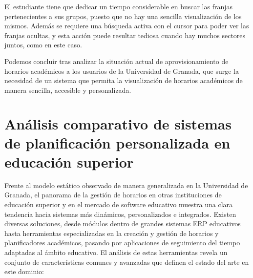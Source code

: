El estudiante tiene que dedicar un tiempo considerable en buscar las franjas pertenecientes a sus grupos, puesto que no hay una sencilla visualización de los mismos. Además se requiere una búsqueda activa con el cursor
para poder ver las franjas ocultas, y esta acción puede resultar tediosa cuando hay muchos sectores juntos, como en este caso.

Podemos concluir tras analizar la situación actual de aprovisionamiento de horarios académicos a los usuarios de la Universidad de Granada, que surge la necesidad de un sistema que permita la visualización de horarios académicos de manera sencilla, accesible y personalizada.

\section{Análisis comparativo de sistemas de planificación personalizada en educación superior}

Frente al modelo estático observado de manera generalizada en la Universidad de Granada, el panorama de la gestión de horarios en otras instituciones de educación superior y en el mercado de software educativo muestra una clara tendencia hacia sistemas más dinámicos, personalizados e integrados. 
\newline\newline
Existen diversas soluciones, desde módulos dentro de grandes sistemas ERP educativos hasta herramientas especializadas en la creación y gestión de horarios y planificadores académicos, pasando por aplicaciones de seguimiento del tiempo adaptadas al ámbito educativo.
El análisis de estas herramientas revela un conjunto de características comunes y avanzadas que definen el estado del arte en este dominio:

